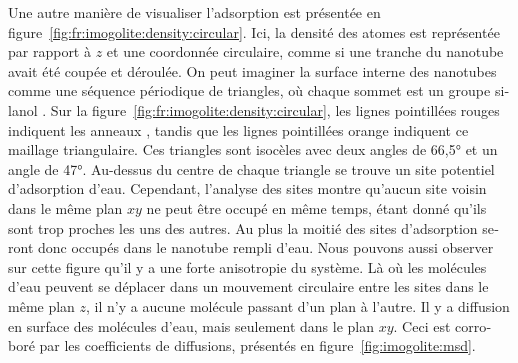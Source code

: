 \documentclass[thesis]{subfiles}
\begin{document}
\begin{otherlanguage}{french}
Une autre manière de visualiser l'adsorption est présentée en
figure~\ref{fig:fr:imogolite:density:circular}. Ici, la densité des atomes est
représentée par rapport à $z$ et une coordonnée circulaire, comme si une tranche
du nanotube avait été coupée et déroulée. On peut imaginer la surface interne
des nanotubes comme une séquence périodique de triangles, où chaque sommet est
un groupe silanol . Sur la figure~\ref{fig:fr:imogolite:density:circular},
les lignes pointillées rouges indiquent les anneaux , tandis que les
lignes pointillées orange indiquent ce maillage triangulaire. Ces triangles sont
isocèles avec deux angles de 66,5° et un angle de 47°. Au-dessus du centre de
chaque triangle se trouve un site potentiel d'adsorption d'eau. Cependant,
l'analyse des sites montre qu'aucun site voisin dans le même plan $xy$ ne peut
être occupé en même temps, étant donné qu'ils sont trop proches les uns des
autres. Au plus la moitié des sites d'adsorption seront donc occupés dans le
nanotube rempli d'eau. Nous pouvons aussi observer sur cette figure qu'il y a
une forte anisotropie du système. Là où les molécules d'eau peuvent se déplacer
dans un mouvement circulaire entre les sites dans le même plan $z$, il n'y a
aucune molécule passant d'un plan à l'autre. Il y a diffusion en surface des
molécules d'eau, mais seulement dans le plan $xy$. Ceci est corroboré par les
coefficients de diffusions, présentés en figure~\ref{fig:imogolite:msd}.


\end{otherlanguage}
\end{document}
